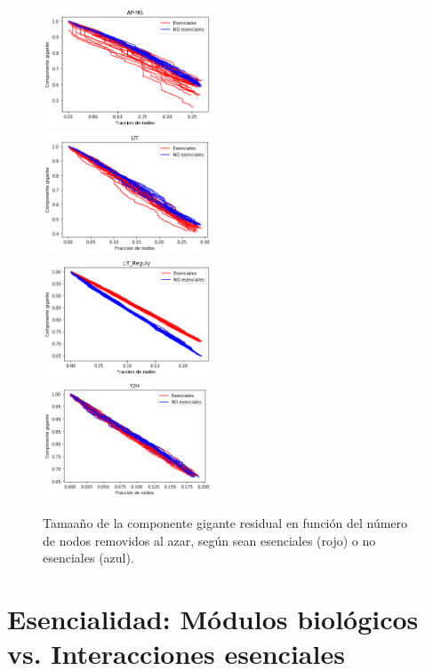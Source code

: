 \documentclass[%
 reprint,
 amsmath,amssymb,
 aps,
]{revtex4-1}
\begin{document}
\begin{figure}
\includegraphics[width=0.45\textwidth]{figura3a.png}\\
\includegraphics[width=0.45\textwidth]{figura3b.png}\\
\includegraphics[width=0.45\textwidth]{figura3c.png}\\
\includegraphics[width=0.45\textwidth]{figura3d.png}\\
\caption{Tamaa\~no de la componente gigante residual en funci\'on del n\'umero de nodos removidos al azar, seg\'un sean esenciales (rojo) o no esenciales (azul).}
\label{figura3}
\end{figure}

\section{Esencialidad: M\'odulos biol\'ogicos vs. Interacciones esenciales}
\end{document}
